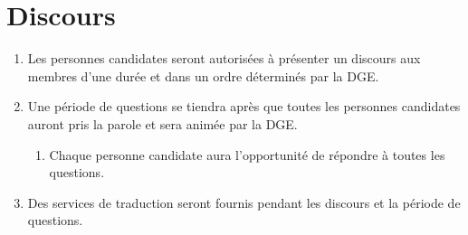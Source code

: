 \section{Discours}
\label{discours}

\begin{enumerate}
 \item Les personnes candidates seront autorisées à présenter un discours aux membres d'une durée et dans un ordre déterminés par la DGE.
 \item Une période de questions se tiendra après que toutes les personnes candidates auront pris la parole et sera animée par la DGE.
  \begin{enumerate}
   \item Chaque personne candidate aura l'opportunité de répondre à toutes les questions.
  \end{enumerate}
 \item Des services de traduction seront fournis pendant les discours et la période de questions.
\end{enumerate}
